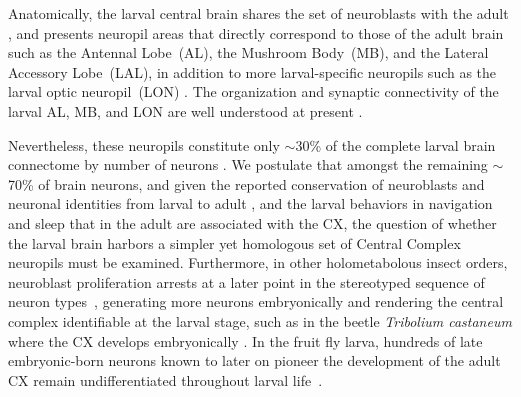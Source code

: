     Anatomically, the larval central brain shares the set of neuroblasts with the adult \citep{lacin2016lineage}, and presents neuropil areas that directly correspond to those of the adult brain such as the Antennal Lobe~(AL), the Mushroom Body~(MB), and the Lateral Accessory Lobe~(LAL), in addition to more larval-specific neuropils such as the larval optic neuropil~(LON) \citep{pereanu2010neuropildev}.
    The organization and synaptic connectivity of the larval AL, MB, and LON are well understood at present \citep{berck2016wiring, eichler2017complete, larderet2017opticlobe}.
    
    Nevertheless, these neuropils constitute only $\sim$30\% of the complete larval brain connectome by number of neurons \citep{winding2023connectome}.
    We postulate that amongst the remaining $\sim$70\% of brain neurons, and given the reported conservation of neuroblasts \citep{lacin2016lineage} and neuronal identities from larval to adult \citep{truman2023metamorphosis}, and the larval behaviors in navigation and sleep that in the adult are associated with the CX, the question of whether the larval brain harbors a simpler yet homologous set of Central Complex neuropils must be examined.
    Furthermore, in other holometabolous insect orders, neuroblast proliferation arrests at a later point in the stereotyped sequence of neuron types~\citep{truman1999origins}, generating more neurons embryonically and rendering the central complex identifiable at the larval stage, such as in the beetle \textit{Tribolium castaneum} where the CX develops embryonically \citep{koniszewski2016TriboliumCX, farnworth2020TriboliumCXvsFly}.
    In the fruit fly larva, hundreds of late embryonic-born neurons known to later on pioneer the development of the adult CX remain undifferentiated throughout larval life~\citep{andrade2019developmentally}.

